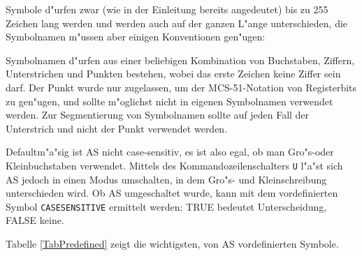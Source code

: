 \documentclass[12pt,a4paper,twoside]{report}
\newcommand{\tty}[1]{{\tt #1}}
\begin{document}
Symbole d"urfen zwar (wie in der Einleitung bereits angedeutet) bis zu
255 Zeichen lang werden und werden auch auf der ganzen L"ange
unterschieden, die Symbolnamen m"ussen aber einigen Konventionen
gen"ugen:
\par
Symbolnamen d"urfen aus einer beliebigen Kombination von Buchstaben,
Ziffern, Unterstrichen und Punkten bestehen, wobei das erste Zeichen
keine Ziffer sein darf.  Der Punkt wurde nur zugelassen, um der
MCS-51-Notation von Registerbits zu gen"ugen, und sollte m"oglichst nicht in
eigenen Symbolnamen verwendet werden.  Zur Segmentierung von Symbolnamen
sollte auf jeden Fall der Unterstrich und nicht der Punkt verwendet werden.
\par
Defaultm"a"sig ist AS nicht case-sensitiv, es ist also egal, ob man
Gro"s-oder Kleinbuchstaben verwendet.  Mittels des Kommandozeilenschalters
\tty{U} l"a"st sich AS jedoch in einen Modus umschalten, in dem Gro"s- und
Kleinschreibung unterschieden wird. Ob AS umgeschaltet wurde, kann mit dem
vordefinierten Symbol \tty{CASESENSITIVE} ermittelt werden: TRUE bedeutet
Unterscheidung, FALSE keine.
\par
Tabelle \ref{TabPredefined} zeigt die wichtigsten, von AS vordefinierten
Symbole.
\end{document}
